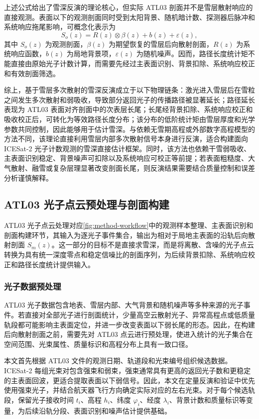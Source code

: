上述公式给出了雪深反演的理论核心，但实际 ATL03 剖面并不是雪层散射响应的直接观测。表面以下的观测剖面同时受到太阳背景、随机暗计数、探测器后脉冲和系统响应拖尾影响，可概念化表示为
\begin{equation}
    S_o(z)=R(z)\otimes \beta(z)+b(z)+\varepsilon(z),
\end{equation}
其中 \(S_o(z)\) 为观测剖面，\(\beta(z)\) 为期望恢复的雪层后向散射剖面，\(R(z)\) 为系统响应函数，\(b(z)\) 为局地背景项，\(\varepsilon(z)\) 为随机噪声。因而，路径长度统计矩不能直接由原始光子计数计算，而需要先经过主表面识别、背景扣除、系统响应校正和有效剖面筛选。

综上，基于雪层多次散射的雪深反演成立于以下物理链条：激光进入雪层后在雪粒之间发生多次散射和弱吸收，导致部分返回光子的传播路径被显著延长；路径延长表现为 ATL03 表面对齐剖面中的次表层长尾；长尾经背景扣除、系统响应校正和吸收校正后，可转化为等效路径长度分布；该分布的低阶统计矩由雪层厚度和光学参数共同控制，因此能够用于估计雪深。与依赖无雪期高程或外部数字高程模型的方法不同，该理论直接利用雪层内部多次散射信号本身进行反演，适合构建面向 ICESat-2 光子计数观测的雪深直接估计框架。同时，该方法也依赖干雪弱吸收、主表面识别稳定、背景噪声可扣除以及系统响应可校正等前提；若表面粗糙度、大气散射、融雪或复杂层理显著改变剖面长尾，则反演结果需要结合质量控制和误差分析谨慎解释\citep{Lu2022Unc}。

\subsection{ATL03 光子点云预处理与剖面构建}
\label{sec:atl03-profile-build}
ATL03 光子点云处理对应\autoref{fig:method-workflow}中的观测样本整理、主表面识别和剖面构建环节，其输入为逐光子事件集合，输出为相对于局地主表面的沿轨后向散射剖面 \(S_m(z)\)。这一部分的目标不是直接求雪深，而是将离散、含噪的光子点云转换为具有统一深度零点和稳定信噪比的剖面序列，为后续背景扣除、系统响应校正和路径长度统计提供输入。

\subsubsection{光子数据预处理}
ATL03 光子数据包含地表、雪层内部、大气背景和随机噪声等多种来源的光子事件。若直接对全部光子进行剖面统计，少量高空云散射光子、异常高程点或低质量轨段都可能影响主表面定位，并进一步改变表面以下弱长尾的形态。因此，在构建后向散射剖面之前，需要先对 ATL03 点云进行预处理，使进入统计的光子集合在空间范围、光束属性、质量标识和高程分布上具有一致口径。

本文首先根据 ATL03 文件的观测日期、轨道段和光束编号组织候选数据。ICESat-2 每组光束对包含强束和弱束，强束通常具有更高的返回光子数和更稳定的主表面回波，更适合提取表面以下弱信号。因此，本文在定量反演和验证中优先使用强束光子，并结合航天器飞行方向确定实际对应的左右光束。对于每个候选轨段，保留光子接收时间 \(t_i\)、高程 \(h_i\)、纬度 \(\varphi_i\)、经度 \(\lambda_i\)、背景计数和质量标识等变量，为后续沿轨分段、表面识别和噪声估计提供基础。

